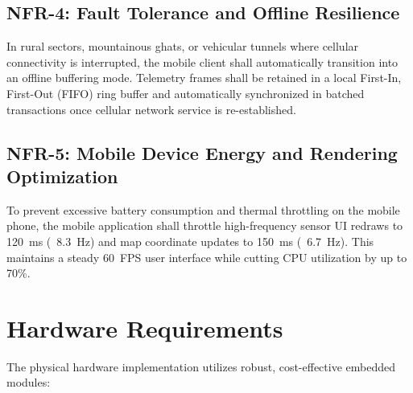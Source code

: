 \subsection{NFR-4: Fault Tolerance and Offline Resilience}
In rural sectors, mountainous ghats, or vehicular tunnels where cellular connectivity is interrupted, the mobile client shall automatically transition into an offline buffering mode. Telemetry frames shall be retained in a local First-In, First-Out (FIFO) ring buffer and automatically synchronized in batched transactions once cellular network service is re-established.

\subsection{NFR-5: Mobile Device Energy and Rendering Optimization}
To prevent excessive battery consumption and thermal throttling on the mobile phone, the mobile application shall throttle high-frequency sensor UI redraws to 120~ms (~8.3~Hz) and map coordinate updates to 150~ms (~6.7~Hz). This maintains a steady 60~FPS user interface while cutting CPU utilization by up to 70\%.

\section{Hardware Requirements}
\label{sec:hardware_reqs}
The physical hardware implementation utilizes robust, cost-effective embedded modules:

